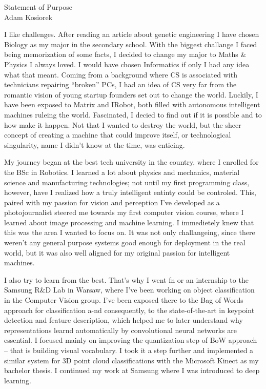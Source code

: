 \setlength{\oddsidemargin}{0in}
\setlength{\evensidemargin}{0in}
\setlength{\textwidth}{6.5in}
\setlength{\topmargin}{-.3in}
\setlength{\textheight}{9in}
\pagestyle{empty}



\begin{center}
{\Large Statement of Purpose} \\[.3in]
{\large Adam Kosiorek}
\end{center}

\vspace*{.5in}

I like challenges. After reading an article about genetic engineering I have chosen Biology as my major in the secondary school. With the biggest challange I faced being memorization of some facts, I decided to change my major to Maths \& Physics I always loved. I would have chosen Informatics if only I had any idea what that meant. Coming from a background where CS is associated with technicians repairing “broken” PCs, I had an idea of CS very far from the romantic vision of young startup founders set out to change the world. Luckily, I have been exposed to Matrix and IRobot, both filled with autonomous intelligent machines ruleing the world. Fascinated, I decied to find out if it is possible and to how make it happen. Not that I wanted to destroy the world, but the sheer concept of creating a machine that could improve itself, or technological singularity, name I didn't know at the time, was enticing. 

My journey began at the best tech university in the country, where I enrolled for the BSc in Robotics. I learned a lot about physics and mechanics, material science and manufacturing technologies; not until my first programming class, however, have I realized how a truly intelligent entinty could be controled. This, paired with my passion for vision and perception I've developed as a photojournalist steered me towards my first computer vision course, where I learned about image processing and machine learning. I immedietely knew that this was the area I wanted to focus on. It was not only challangeing, since there weren't any general purpose systems good enough for deployment in the real world, but it was also well aligned for my original passion for intelligent machines.

I also try to learn from the best. That's why I went fn or an internship to the Samsung R\&D Lab in Warsaw, where I've been working on object classification in the Computer Vision group. I've been exposed there to the Bag of Words approach for classification a-nd consequently, to the state-of-the-art in keypoint detection and feature description, which helped me to later understand why representations learnd automatically by convolutional neural networks are essential. I focused mainly on improving the quantization step of BoW approach – that is building visual vocabulary. I took it a step further and implemented a similar system for 3D point cloud classifications with the Microsoft Kinect as my bachelor thesis. I continued my work at Samsung where I was introduced to deep learning.

